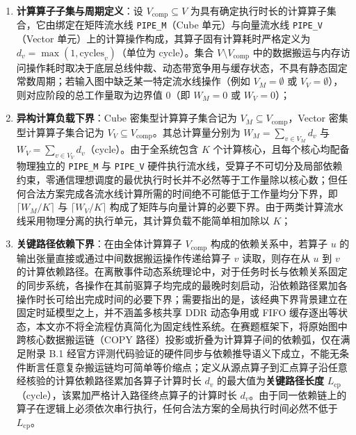 \documentclass[anonymous,withtoc]{gmcm2026}
\providecommand{\tightlist}{\setlength{\itemsep}{0pt}\setlength{\parskip}{0pt}}
\begin{document}
\begin{enumerate}
\def\labelenumi{\arabic{enumi}.}
\tightlist
\item
  \textbf{计算算子子集与周期定义}：设 \(V_{\mathrm{comp}} \subseteq V\) 为具有确定执行时长的计算算子集合，它由绑定在矩阵流水线 \texttt{PIPE\_M}（Cube 单元）与向量流水线 \texttt{PIPE\_V}（Vector 单元）上的计算操作构成，其算子固有计算耗时严格定义为 \(d_v = \max(1, \text{cycles}_v)\)（单位为 cycle）。集合 \(V \setminus V_{\mathrm{comp}}\) 中的数据搬运与内存访问操作耗时取决于底层总线仲裁、动态带宽争用与缓存状态，不具有静态固定常数周期；若输入图中缺乏某一特定流水线操作（例如 \(V_M = \emptyset\) 或 \(V_V = \emptyset\)），则对应阶段的总工作量取为边界值 0（即 \(W_M = 0\) 或 \(W_V = 0\)）；
\item
  \textbf{异构计算负载下界}：Cube 密集型计算算子集合记为 \(V_M \subseteq V_{\mathrm{comp}}\)，Vector 密集型计算算子集合记为 \(V_V \subseteq V_{\mathrm{comp}}\)。其总计算量分别为 \(W_M = \sum_{v \in V_M} d_v\) 与 \(W_V = \sum_{v \in V_V} d_v\)（cycle）。由于全系统包含 \(K\) 个计算核心，且每个核心均配备物理独立的 \texttt{PIPE\_M} 与 \texttt{PIPE\_V} 硬件执行流水线，受算子不可切分及局部依赖约束，零通信理想调度的最优执行时长并不必然等于工作量除以核心数；但任何合法方案完成各流水线计算所需的时间绝不可能低于工作量均分下界，即 \(\lceil W_M / K \rceil\) 与 \(\lceil W_V / K \rceil\) 构成了矩阵与向量计算的必要下界。由于两类计算流水线采用物理分离的执行单元，其计算负载不能简单相加除以 \(K\)；
\item
  \textbf{关键路径依赖下界}：在由全体计算算子 \(V_{\mathrm{comp}}\) 构成的依赖关系中，若算子 \(u\) 的输出张量直接或通过中间数据搬运操作传递给算子 \(v\) 读取，则存在从 \(u\) 到 \(v\) 的计算依赖路径。在离散事件动态系统理论中，对于任务时长与依赖关系固定的同步系统，各操作在其前驱算子均完成的最晚时刻启动，沿依赖路径累加各操作时长可给出完成时间的必要下界\cite{ref20}；需要指出的是，该经典下界背景建立在固定时延模型之上，并不涵盖多核共享 DDR 动态争用或 FIFO 缓存逐出等状态，本文亦不将全流程仿真简化为固定线性系统。在赛题框架下，将原始图中跨核心数据搬运链（COPY 路径）投影或折叠为计算算子间的依赖弧，仅在满足附录 B.1 经官方评测代码验证的硬件同步与依赖推导语义下成立，不能无条件断言任意复杂搬运链均可简单等价缩点；定义从源点算子到汇点算子沿任意经核验的计算依赖路径累加各算子计算时长 \(d_v\) 的最大值为\textbf{关键路径长度} \(L_{\mathrm{cp}}\)（cycle），该累加严格计入路径终点算子的计算时长 \(d_v\)。由于同一依赖链上的算子在逻辑上必须依次串行执行，任何合法方案的全局执行时间必然不低于 \(L_{\mathrm{cp}}\)。
\end{enumerate}
\end{document}
